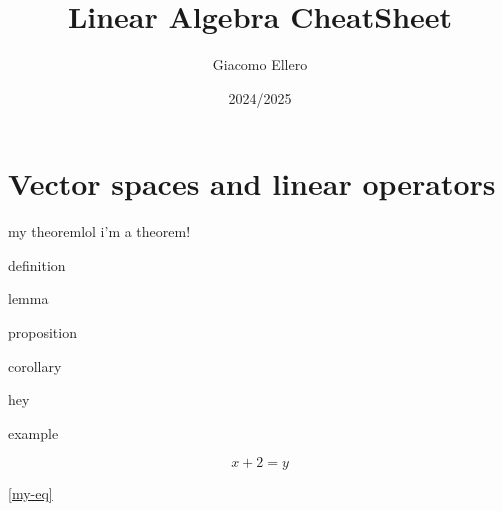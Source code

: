 \documentclass[12pt]{extarticle}
\title{Linear Algebra CheatSheet}
\author{Giacomo Ellero}
\date{2024/2025}
\begin{document}
\firstpage

\section{Vector spaces and linear operators}

\begin{theorem}{my theorem}{lol}
    i'm a theorem!
\end{theorem}

\begin{definition}{}{}
    definition
\end{definition}

\begin{lemma}{}{}
    lemma
\end{lemma}

\begin{proposition}{}{}
    proposition
\end{proposition}

\begin{corollary}{}{}
    corollary
\end{corollary}

\begin{remark}{}{}
    hey
\end{remark}

\begin{example}{}{}
    example
\end{example}

\begin{equation}
    \label{my-eq}
    x+2 = y
\end{equation}

\cref{my-eq}
\end{document}
